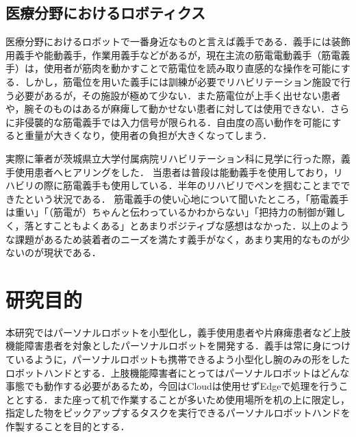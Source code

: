 \subsection{医療分野におけるロボティクス}
医療分野におけるロボットで一番身近なものと言えば義手である．義手には装飾用義手や能動義手，作業用義手などがあるが，現在主流の筋電電動義手（筋電義手）は，使用者が筋肉を動かすことで筋電位を読み取り直感的な操作を可能にする．しかし，筋電位を用いた義手には訓練が必要でリハビリテーション施設で行う必要があるが，その施設が極めて少ない\cite{リハビリテーション}．また筋電位が上手く出せない患者や，腕そのものはあるが麻痺して動かせない患者に対しては使用できない．さらに非侵襲的な筋電義手では入力信号が限られる．自由度の高い動作を可能にすると重量が大きくなり，使用者の負担が大きくなってしまう．

実際に筆者が茨城県立大学付属病院リハビリテーション科に見学に行った際，義手使用患者へヒアリングをした．
当患者は普段は能動義手を使用しており，リハビリの際に筋電義手も使用している．半年のリハビリでペンを掴むことまでできたという状況である．
筋電義手の使い心地について聞いたところ，「筋電義手は重い」「（筋電が）ちゃんと伝わっているかわからない」「把持力の制御が難しく，落とすこともよくある」とあまりポジティブな感想はなかった．以上のような課題があるため装着者のニーズを満たす義手がなく，あまり実用的なものが少ないのが現状である．


\begin{comment}
\section{関連研究}
ここではロボット開発の研究について紹介する．

TOYOTAはHuman Support Robot(HSR)を開発した\cite{HSR}．



机に置いて使うもの
Basic research of upper limb work support system “My Cybernic Robot Arm” for hemiplegic persons


強化学習で制御
教師ありで制御
\end{comment}


\section{研究目的}
本研究ではパーソナルロボットを小型化し，義手使用患者や片麻痺患者など上肢機能障害患者を対象としたパーソナルロボットを開発する．義手は常に身につけているように，パーソナルロボットも携帯できるよう小型化し腕のみの形をしたロボットハンドとする．上肢機能障害者にとってはパーソナルロボットはどんな事態でも動作する必要があるため，今回はCloudは使用せずEdgeで処理を行うこととする．また座って机で作業することが多いため使用場所を机の上に限定し，指定した物をピックアップするタスクを実行できるパーソナルロボットハンドを作製することを目的とする．
